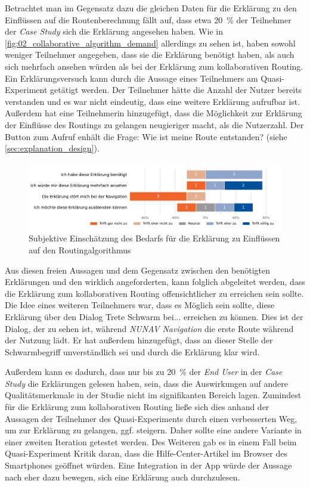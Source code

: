 Betrachtet man im Gegensatz dazu die gleichen Daten für die Erklärung zu den Einflüssen auf die Routenberechnung fällt auf, dass etwa 20~\% der Teilnehmer der \textit{Case Study} sich die Erklärung angesehen haben. Wie in \autoref{fig:02_collaborative_algorithm_demand} allerdings zu sehen ist, haben sowohl weniger Teilnehmer angegeben, dass sie die Erklärung benötigt haben, als auch sich mehrfach ansehen würden als bei der Erklärung zum kollaborativen Routing. Ein Erklärungsversuch kann durch die Aussage eines Teilnehmers am Quasi-Experiment getätigt werden. Der Teilnehmer hätte die Anzahl der Nutzer bereits verstanden und es war nicht eindeutig, dass eine weitere Erklärung aufrufbar ist. Außerdem hat eine Teilnehmerin hinzugefügt, dass die Möglichkeit zur Erklärung der Einflüsse des Routings zu gelangen neugieriger macht, als die Nutzerzahl. Der Button zum Aufruf enhält die Frage: \glqq Wie ist meine Route entstanden?\grqq{} (siehe \autoref{sec:explanation_design}).

\begin{figure}[htb!]
    \centering
    \includegraphics[width=\textwidth]{contents/06_model_evaluation/02_evaluation/res/qualitativeFeedback-02_collaborative_algorithm_demand.pdf}
    \caption{Subjektive Einschätzung des Bedarfs für die Erklärung zu Einflüssen auf den Routingalgorithmus}
    \label{fig:02_collaborative_algorithm_demand}
\end{figure}

Aus diesen freien Aussagen und dem Gegensatz zwischen den benötigten Erklärungen und den wirklich angeforderten, kann folglich abgeleitet werden, dass die Erklärung zum kollaborativen Routing offensichtlicher zu erreichen sein sollte. Die Idee eines weiteren Teilnehmers war, dass es Möglich sein sollte, diese Erklärung über den Dialog \glqq Trete Schwarm bei...\grqq{} erreichen zu können. Dies ist der Dialog, der zu sehen ist, während \textit{NUNAV Navigation} die erste Route während der Nutzung lädt. Er hat außerdem hinzugefügt, dass an dieser Stelle der Schwarmbegriff unverständlich sei und durch die Erklärung klar wird.

Außerdem kann es dadurch, dass nur bis zu 20~\% der \textit{End User} in der \textit{Case Study} die Erklärungen gelesen haben, sein, dass die Auswirkungen auf andere Qualitätsmerkmale in der Studie nicht im signifikanten Bereich lagen. Zumindest für die Erklärung zum kollaborativen Routing ließe sich dies anhand der Aussagen der Teilnehmer des Quasi-Experiments durch einen verbesserten Weg, um zur Erklärung zu gelangen, ggf. steigern. Daher sollte eine andere Variante in einer zweiten Iteration getestet werden. Des Weiteren gab es in einem Fall beim Quasi-Experiment Kritik daran, dass die Hilfe-Center-Artikel im Browser des Smartphones geöffnet würden. Eine Integration in der App würde der Aussage nach eher dazu bewegen, sich eine Erklärung auch durchzulesen.

